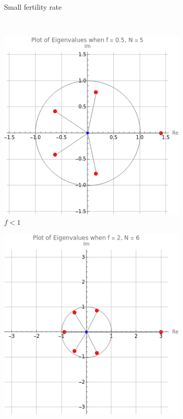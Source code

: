 \documentclass[11pt,reqno]{amsart}
\numberwithin{equation}{section}
\theoremstyle{plain}
\begin{document}
\begin{figure}[htp]
\begin{subfigure}[b]{0.45\textwidth}
        \caption{Small fertility rate}
        \label{fig:fig2}
    \end{subfigure}
    \\
    \begin{subfigure}[b]{0.45\textwidth}
        \includegraphics[width=\textwidth]{fHfN5.png}
        \caption{$f < 1$}
        \label{fig:fig3}
    \end{subfigure}
    \hfill
    \begin{subfigure}[b]{0.45\textwidth}
        \includegraphics[width=\textwidth]{f2N6.png}

\end{subfigure}
\end{figure}
\end{document}
